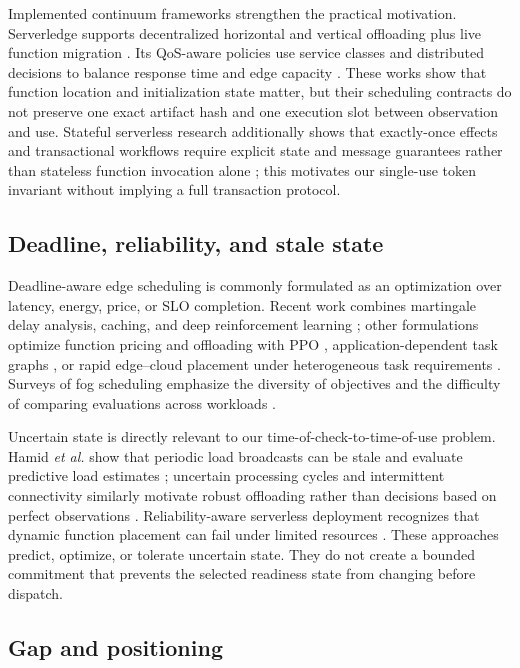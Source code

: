 \documentclass[conference]{IEEEtran}
\begin{document}
Implemented continuum frameworks strengthen the practical motivation. Serverledge supports decentralized horizontal and vertical offloading plus live function migration \cite{russo2024framework}. Its QoS-aware policies use service classes and distributed decisions to balance response time and edge capacity \cite{russo2024qos}. These works show that function location and initialization state matter, but their scheduling contracts do not preserve one exact artifact hash and one execution slot between observation and use.
Stateful serverless research additionally shows that exactly-once effects and
transactional workflows require explicit state and message guarantees rather than
stateless function invocation alone \cite{deheus2022transactions}; this motivates
our single-use token invariant without implying a full transaction protocol.

\subsection{Deadline, reliability, and stale state}

Deadline-aware edge scheduling is commonly formulated as an optimization over latency, energy, price, or SLO completion. Recent work combines martingale delay analysis, caching, and deep reinforcement learning \cite{dong2025delay}; other formulations optimize function pricing and offloading with PPO \cite{liu2025pricing}, application-dependent task graphs \cite{sun2021application}, or rapid edge--cloud placement under heterogeneous task requirements \cite{liu2024fast}. Surveys of fog scheduling emphasize the diversity of objectives and the difficulty of comparing evaluations across workloads \cite{hosseinzadeh2023survey}.

Uncertain state is directly relevant to our time-of-check-to-time-of-use problem. Hamid \emph{et al.} show that periodic load broadcasts can be stale and evaluate predictive load estimates \cite{hamid2026staleness}; uncertain processing cycles and intermittent connectivity similarly motivate robust offloading rather than decisions based on perfect observations \cite{deng2024uncertain}. Reliability-aware serverless deployment recognizes that dynamic function placement can fail under limited resources \cite{zhang2025reliability}. These approaches predict, optimize, or tolerate uncertain state. They do not create a bounded commitment that prevents the selected readiness state from changing before dispatch.

\subsection{Gap and positioning}
\end{document}
